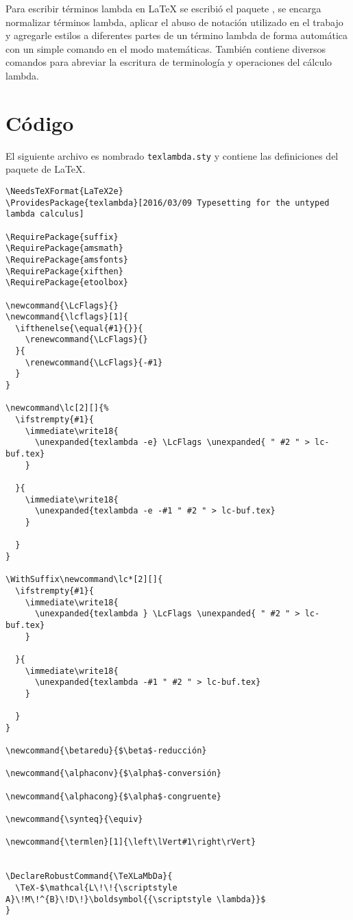 Para escribir términos lambda en \LaTeX{} se escribió el paquete \TeXLaMbDa, se encarga normalizar términos lambda, aplicar el abuso de notación utilizado en el trabajo y agregarle estilos a diferentes partes de un término lambda de forma automática con un simple comando en el modo matemáticas. También contiene diversos comandos para abreviar la escritura de terminología y operaciones del cálculo lambda.\\

\section{Código}
El siguiente archivo es nombrado \texttt{texlambda.sty} y contiene las definiciones del paquete de \LaTeX.

\begin{verbatim}
\NeedsTeXFormat{LaTeX2e}
\ProvidesPackage{texlambda}[2016/03/09 Typesetting for the untyped lambda calculus]

\RequirePackage{suffix}
\RequirePackage{amsmath}
\RequirePackage{amsfonts}
\RequirePackage{xifthen}
\RequirePackage{etoolbox}

\newcommand{\LcFlags}{}
\newcommand{\lcflags}[1]{
  \ifthenelse{\equal{#1}{}}{
    \renewcommand{\LcFlags}{}
  }{
    \renewcommand{\LcFlags}{-#1}
  }
}

\newcommand\lc[2][]{%
  \ifstrempty{#1}{
    \immediate\write18{
      \unexpanded{texlambda -e} \LcFlags \unexpanded{ " #2 " > lc-buf.tex}
    }
    
  }{
    \immediate\write18{
      \unexpanded{texlambda -e -#1 " #2 " > lc-buf.tex}
    }
    
  }
}

\WithSuffix\newcommand\lc*[2][]{
  \ifstrempty{#1}{
    \immediate\write18{
      \unexpanded{texlambda } \LcFlags \unexpanded{ " #2 " > lc-buf.tex}
    }
    
  }{
    \immediate\write18{
      \unexpanded{texlambda -#1 " #2 " > lc-buf.tex}
    }
    
  }
}

\newcommand{\betaredu}{$\beta$-reducción}

\newcommand{\alphaconv}{$\alpha$-conversión}

\newcommand{\alphacong}{$\alpha$-congruente}

\newcommand{\synteq}{\equiv}

\newcommand{\termlen}[1]{\left\lVert#1\right\rVert}


\DeclareRobustCommand{\TeXLaMbDa}{
  \TeX-$\mathcal{L\!\!{\scriptstyle A}\!M\!^{B}\!D\!}\boldsymbol{{\scriptstyle \lambda}}$
}
\end{verbatim}

